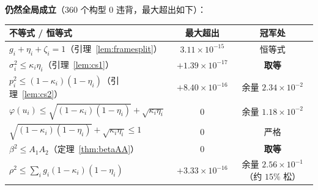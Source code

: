 \textbf{仍然全局成立}（$360$ 个构型 $0$ 违背，最大超出如下）：
\begin{center}\small
\begin{tabular}{lcc}
\hline
不等式 / 恒等式 & 最大超出 & 冠军处 \\
\hline
$g_i+\eta_i+\zeta_i=1$（引理~\ref{lem:framesplit}） & $3.11\times10^{-15}$ & 恒等式 \\
$\sigma_i^2\le\kappa_i\eta_i$（引理~\ref{lem:cs1}） & $+1.39\times10^{-17}$ & \textbf{取等} \\
$p_i^2\le(1-\kappa_i)(1-\eta_i)$（引理~\ref{lem:cs2}） & $+8.40\times10^{-16}$ & 余量 $2.34\times10^{-2}$ \\
$\varphi(u_i)\le\sqrt{(1-\kappa_i)(1-\eta_i)}+\sqrt{\kappa_i\eta_i}$ & $0$ & 余量 $1.18\times10^{-2}$ \\
$\sqrt{(1-\kappa_i)(1-\eta_i)}+\sqrt{\kappa_i\eta_i}\le1$ & $0$ & 严格 \\
$\beta^2\le A_1A_2$（定理~\ref{thm:betaAA}） & $0$ & \textbf{取等} \\
$\rho^2\le\sum_ig_i(1-\kappa_i)(1-\eta_i)$ & $+3.33\times10^{-16}$ & 余量 $2.56\times10^{-1}$（约 $15\%$ 松） \\
\hline
\end{tabular}
\end{center}

